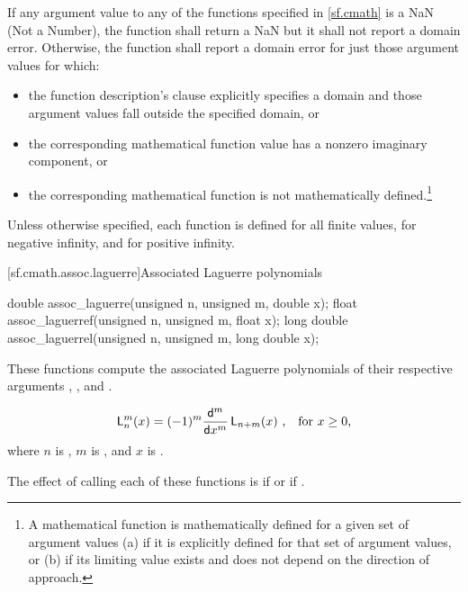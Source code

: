 \pnum
{}%
If any argument value
to any of the functions specified in \ref{sf.cmath}
is a NaN (Not a Number),
the function shall return a NaN
but it shall not report a domain error.
Otherwise,
the function shall report a domain error
for just those argument values
for which:
\begin{itemize}
  \item
  the function description's \returns clause
  explicitly specifies a domain
  and those argument values fall
  outside the specified domain,
  or

  \item
  the corresponding mathematical function value
  has a nonzero imaginary component,
  or

  \item
  the corresponding mathematical function
  is not mathematically defined.\footnote{%
    A mathematical function
    is mathematically defined
    for a given set of argument values
    (a)
      if it is explicitly defined
      for that set of argument values,
      or
    (b)
      if its limiting value exists
      and does not depend
      on the direction of approach.}
\end{itemize}

\pnum
Unless otherwise specified,
each function is defined
for all finite values,
for negative infinity,
and for positive infinity.

[sf.cmath.assoc.laguerre]{Associated Laguerre polynomials}%
%
%
%
%
%
\begin{itemdecl}
double       assoc_laguerre(unsigned n, unsigned m, double x);
float        assoc_laguerref(unsigned n, unsigned m, float x);
long double  assoc_laguerrel(unsigned n, unsigned m, long double x);
\end{itemdecl}

\begin{itemdescr}
\pnum
\effects
These functions compute
the associated Laguerre polynomials
of their respective arguments
, , and .

\pnum
\returns
\[ \mathsf{L}_n^m(x) =
   (-1)^m \frac{\mathsf{d} ^ m}{\mathsf{d}x ^ m} \, \mathsf{L}_{n+m}(x)
   \text{ ,\quad for $x \ge 0$,} \]
where
$n$ is ,
$m$ is , and
$x$ is .

\pnum
\remarks
The effect of calling each of these functions
is 
if  or if .
\end{itemdescr}

